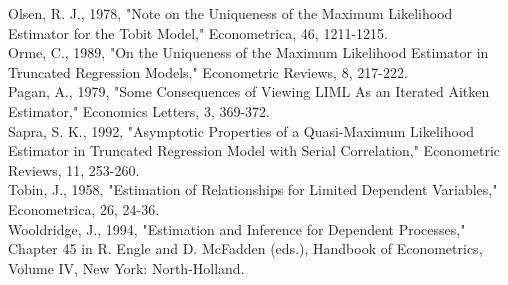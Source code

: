 \documentclass[10pt]{article}
\begin{document}
Olsen, R. J., 1978, "Note on the Uniqueness of the Maximum Likelihood Estimator for the Tobit Model," Econometrica, 46, 1211-1215.\\
Orme, C., 1989, "On the Uniqueness of the Maximum Likelihood Estimator in Truncated Regression Models," Econometric Reviews, 8, 217-222.\\
Pagan, A., 1979, "Some Consequences of Viewing LIML As an Iterated Aitken Estimator," Economics Letters, 3, 369-372.\\
Sapra, S. K., 1992, "Asymptotic Properties of a Quasi-Maximum Likelihood Estimator in Truncated Regression Model with Serial Correlation," Econometric Reviews, 11, 253-260.\\
Tobin, J., 1958, "Estimation of Relationships for Limited Dependent Variables," Econometrica, 26, 24-36.\\
Wooldridge, J., 1994, "Estimation and Inference for Dependent Processes," Chapter 45 in R. Engle and D. McFadden (eds.), Handbook of Econometrics, Volume IV, New York: North-Holland.
\end{document}
